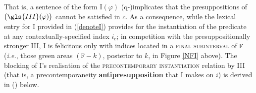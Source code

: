That is, a sentence of the form \gls{I}$ (\varphi) $ ({\sc q}-)implicates that the presuppositions of $ \big(\gls{III}(\varphi)\big) $ cannot be satisfied in $ c $. As a consequence, while the lexical entry for \gls{I} provided in (\ref{denoteI}) provides for the instantiation of the predicate at any contextually-specified index $ i_c $; in competition with the presuppositionally stronger \gls{III}, \gls{I} is felicitous only with indices located in a \textsc{final subinterval} of $ \mathtt{F} $ (\textit{i.e.}, those green areas $ (\texttt{F}-k) $, posterior to $ k $, in Figure \ref{NFI} above). The blocking of \gls{I}'s realisation of the \textsc{precontemporary instantiation}  relation by \gls{III} (that is, a precontemporaneity \textbf{antipresupposition} that \gls{I} makes on $ i $) is derived in (\nextx) below.
%
%
%
%



